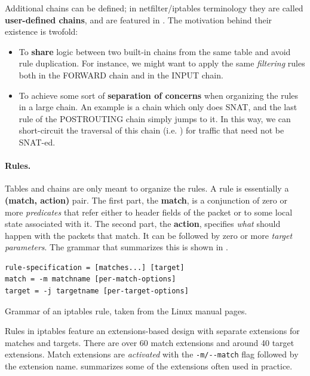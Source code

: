 Additional chains can be defined; in netfilter/iptables terminology they are
called \textbf{user-defined chains}, and are featured in
. The motivation behind their
existence is twofold:
\begin{itemize}
  \item To \textbf{share} logic between two built-in chains from the same table
    and avoid rule duplication.  For instance, we might want to apply the same
    \emph{filtering} rules both in the FORWARD chain and in the INPUT chain.
  \item To achieve some sort of \textbf{separation of concerns} when organizing
    the rules in a large chain. An example is a chain which only does SNAT, and
    the last rule of the POSTROUTING chain simply jumps to it.  In this way, we
    can short-circuit the traversal of this chain (i.e. )
    for traffic that need not be SNAT-ed.
\end{itemize}

\paragraph{Rules.}
Tables and chains are only meant to organize the rules.  A rule is essentially
a \textbf{(match, action)} pair.  The first part, the \textbf{match}, is a
conjunction of zero or more \emph{predicates} that refer either to header
fields of the packet or to some local state associated with it.  The second
part, the \textbf{action}, specifies \emph{what} should happen with the packets
that match.  It can be followed by zero or more \emph{target parameters}. The
grammar that summarizes this is shown in
.

\begin{listing}
  \lstset{numbers=none, frame=single, basicstyle=\ttfamily,
    xleftmargin=0.15\textwidth, xrightmargin=0.15\textwidth
  }
\begin{lstlisting}
rule-specification = [matches...] [target]
match = -m matchname [per-match-options]
target = -j targetname [per-target-options]
\end{lstlisting}
  \caption{Grammar of an iptables rule, taken from the Linux manual pages.}
  \label{lst:rule-grammar}
\end{listing}

Rules in iptables feature an extensions-based design with separate extensions
for matches and targets. There are over 60 match extensions and around 40
target extensions.  Match extensions are \emph{activated} with the
\lstinline{-m/--match} flag followed by the extension name.
 summarizes some of the
extensions often used in practice.


